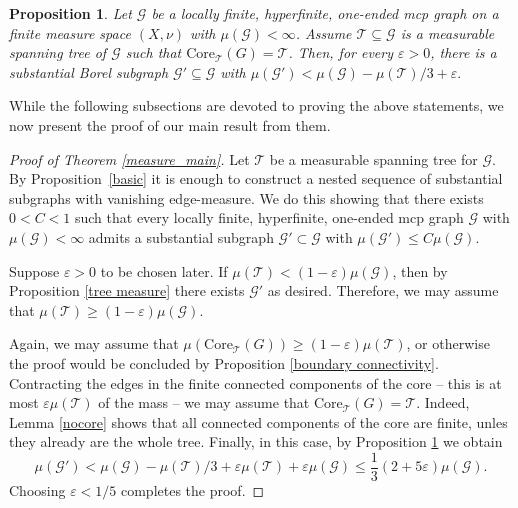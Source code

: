 \documentclass[letterpaper,11pt,reqno]{amsart}
\theoremstyle{bfnote}
\newtheorem{prop}[theorem]{Proposition}
\theoremstyle{definition}
\newcommand{\0}{\varnothing}
\renewcommand{\epsilon}{\varepsilon}
\newcommand{\eps}{\epsilon}
\renewcommand{\leq}{\leqslant}
\renewcommand{\geq}{\geqslant}
\numberwithin{equation}{section}
\begin{document}
\begin{prop}\label{sparse_substential}
    Let $\mathcal{G}$ be a locally finite, hyperfinite, one-ended mcp graph on a finite measure space $(X,\nu)$ with $\mu(\mathcal{G})<\infty$. Assume $\mathcal{T}\subseteq\mathcal{G}$ is a measurable spanning tree of $\mathcal{G}$ such that $\mathrm{Core}_\mathcal{T}(G)=\mathcal{T}$. 
    Then, for every $\eps >0$, there is a substantial Borel subgraph $\mathcal{G}'\subseteq \mathcal{G}$ with $\mu(\mathcal{G}')< \mu(\mathcal{G})-\mu(\mathcal{T})/3 + \eps.$ 
\end{prop}

While the following subsections are devoted to proving the above statements, we now present the proof of our main result from them. 

\begin{proof}[Proof of Theorem \ref{measure_main}]

    Let $\mathcal T$ be a measurable spanning tree for $\mathcal G$. By Proposition~\ref{basic} it is enough to construct a nested sequence of substantial subgraphs with vanishing edge-measure. We do this showing that there exists $0 < C<1$ such that every locally finite, hyperfinite, one-ended mcp graph $\mathcal G$ with $\mu (\mathcal G) < \infty$ admits a substantial subgraph $\mathcal G'\subset \mathcal G$ with $\mu (\mathcal G') \leq C \mu (\mathcal G)$.

    Suppose $\eps >0$ to be chosen later. 
    If $\mu (\mathcal T) < (1 - \eps) \mu(\mathcal G)$, then by Proposition \ref{tree measure} there exists $\mathcal G'$ as desired. Therefore, we may assume that $\mu (\mathcal T) \geq (1 - \eps) \mu(\mathcal G)$.

    Again, we may assume that $\mu (\mathrm{Core}_\mathcal{T}(G))\geq (1 - \eps) \mu (\mathcal{T})$, or otherwise the proof would be concluded by Proposition \ref{boundary connectivity}. Contracting the edges in the finite connected components of the core -- this is at most $\eps \mu (\mathcal T)$ of the mass -- we may assume that $\mathrm{Core}_\mathcal{T}(G)=\mathcal{T}$. Indeed, Lemma \ref{nocore} shows that all connected components of the core are finite, unles they already are the whole tree. Finally, in this case, by Proposition \ref{sparse_substential} we obtain $$
    \mu (\mathcal G') < \mu (\mathcal G) - \mu (\mathcal T)/3 + \eps \mu (\mathcal T) + \eps \mu (\mathcal G) \leq \frac{1}{3}(2 + 5\eps) \mu (\mathcal G).
    $$
Choosing $\eps < 1/5$ completes the proof.
\end{proof}
\end{document}
